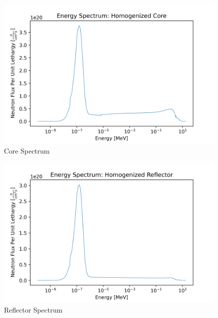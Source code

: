 \begin{figure}[H]
\centering
  \includegraphics[width=0.95\linewidth]{figures/core_spec_homog}
  \caption{Core Spectrum}
  \label{fig:hom-core}
\end{figure}

\begin{figure}[H]
\centering
  \includegraphics[width=0.95\linewidth]{figures/reflect_spec_homog}
  \caption{Reflector Spectrum}
  \label{fig:hom-reflec}
\end{figure}
